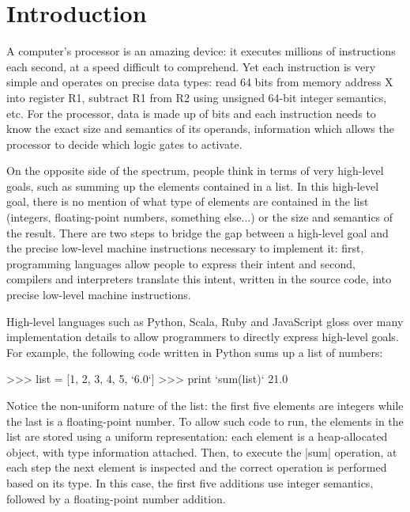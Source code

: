 \chapter{Introduction}
\label{chapter:intro}

A computer's processor is an amazing device: it executes millions of instructions each second, at a speed difficult to comprehend. Yet each instruction is very simple and operates on precise data types: read 64 bits from memory address X into register R1, subtract R1 from R2 using unsigned 64-bit integer semantics, etc. For the processor, data is made up of bits and each instruction needs to know the exact size and semantics of its operands, information which allows the processor to decide which logic gates to activate.

On the opposite side of the spectrum, people think in terms of very high-level goals, such as summing up the elements contained in a list. In this high-level goal, there is no mention of what type of elements are contained in the list (integers, floating-point numbers, something else...) or the size and semantics of the result. There are two steps to bridge the gap between a high-level goal and the precise low-level machine instructions necessary to implement it: first, programming languages allow people to express their intent and second, compilers and interpreters translate this intent, written in the source code, into precise low-level machine instructions.

High-level languages such as Python, Scala, Ruby and JavaScript gloss over many implementation details to allow programmers to directly express high-level goals. For example, the following code written in Python sums up a list of numbers:

\begin{lstlisting-nobreak}
 >>> list = [1, 2, 3, 4, 5, `6.0`]
 >>> print `sum(list)`
 21.0
\end{lstlisting-nobreak}

Notice the non-uniform nature of the list: the first five elements are integers while the last is a floating-point number. To allow such code to run, the elements in the list are stored using a uniform representation: each element is a heap-allocated object, with type information attached. Then, to execute the |sum| operation, at each step the next element is inspected and the correct operation is performed based on its type. In this case, the first five additions use integer semantics, followed by a floating-point number addition. %

